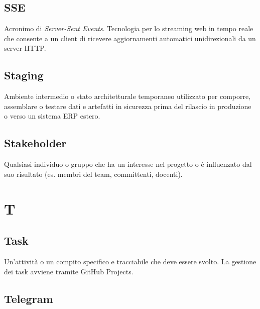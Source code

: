 \documentclass[a4paper, 11pt, oneside]{scrartcl} %
\begin{document}
\subsection*{SSE}
Acronimo di \textit{Server-Sent Events}. Tecnologia per lo streaming web in tempo reale che consente a un client di ricevere aggiornamenti automatici unidirezionali da un server HTTP.
\vspace{0.5cm}

\subsection*{Staging}
Ambiente intermedio o stato architetturale temporaneo utilizzato per comporre, assemblare o testare dati e artefatti in sicurezza prima del rilascio in produzione o verso un sistema ERP estero.
\vspace{0.5cm}

\subsection*{Stakeholder}


Qualsiasi individuo o gruppo che ha un interesse nel progetto o è influenzato dal suo risultato (es. membri del team, committenti, docenti).

\vspace{0.5cm}



\section*{T}


\subsection*{Task}


Un'attività o un compito specifico e tracciabile che deve essere svolto. La gestione dei task avviene tramite GitHub Projects.

\vspace{0.5cm}

\subsection*{Telegram}
\end{document}

